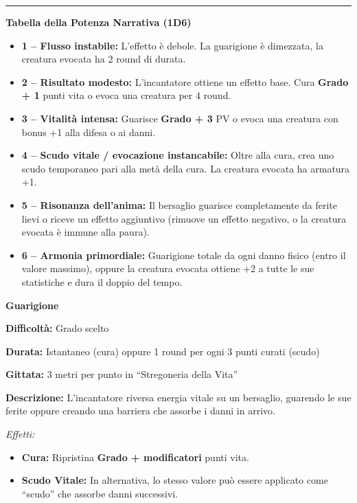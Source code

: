 \documentclass[./magie.tex]{subfiles}
\begin{document}
\vspace{0.2cm}
\noindent
\begin{center}
\rule{\textwidth}{0.4pt} 
\end{center}
\vspace{0.2cm}
{\zarafirtitlefont\Large\bfseries\noindent Tabella della Potenza Narrativa (1D6)}
\begin{itemize}
\item \textbf{1 – Flusso instabile:} L’effetto è debole. La guarigione è dimezzata, la creatura evocata ha 2 round di durata.
\item \textbf{2 – Risultato modesto:} L’incantatore ottiene un effetto base. Cura \textbf{Grado + 1} punti vita o evoca una creatura per 4 round.
\item \textbf{3 – Vitalità intensa:} Guarisce \textbf{Grado + 3} PV o evoca una creatura con bonus +1 alla difesa o ai danni.
\item \textbf{4 – Scudo vitale / evocazione instancabile:} Oltre alla cura, crea uno scudo temporaneo pari alla metà della cura. La creatura evocata ha armatura +1.
\item \textbf{5 – Risonanza dell’anima:} Il bersaglio guarisce completamente da ferite lievi o riceve un effetto aggiuntivo (rimuove un effetto negativo, o la creatura evocata è immune alla paura).
\item \textbf{6 – Armonia primordiale:} Guarigione totale da ogni danno fisico (entro il valore massimo), oppure la creatura evocata ottiene +2 a tutte le sue statistiche e dura il doppio del tempo.
\end{itemize}

\clearpage

{\zarafirtitlefont\Large\bfseries\noindent Guarigione}\\
\begin{description}
\item \textbf{Difficoltà:} Grado scelto
\item \textbf{Durata:} Istantaneo (cura) oppure 1 round per ogni 3 punti curati (scudo)
\item \textbf{Gittata:} 3 metri per punto in “Stregoneria della Vita”
\item \textbf{Descrizione:} L’incantatore riversa energia vitale su un bersaglio, guarendo le sue ferite oppure creando una barriera che assorbe i danni in arrivo.

\textit{Effetti:}
\begin{itemize}
  \item \textbf{Cura:} Ripristina \textbf{Grado + modificatori} punti vita.
  \item \textbf{Scudo Vitale:} In alternativa, lo stesso valore può essere applicato come “scudo” che assorbe danni successivi.
\end{itemize}
\end{description}
\end{document}
